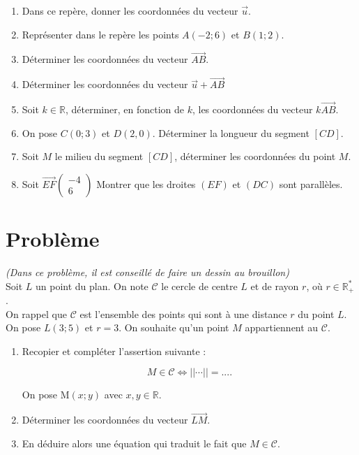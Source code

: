 \documentclass[french]{book}
\begin{document}
\begin{enumerate}

\item Dans ce repère, donner les coordonnées du vecteur $\overrightarrow{u}$.

\item Représenter dans le repère les points $A(-2 ;6)$ et $B(1;2)$.

\item Déterminer les coordonnées  du vecteur $\overrightarrow{AB}$.

\item Déterminer les coordonnées du vecteur $\overrightarrow{u} + \overrightarrow{AB} $

\item Soit $k \in \mathbb{R}$, déterminer, en fonction de $k$, les coordonnées du vecteur $k\overrightarrow{AB}$. 

\item On pose $C(0;3)$ et $D(2,0)$. Déterminer la longueur du segment $[CD]$.

\item Soit $M$ le milieu du segment $[CD]$, déterminer les coordonnées du point $M$.   

\item Soit $\overrightarrow{EF} \left( \begin{array}{c}
-4 \\
6 
\end{array} \right)$
 Montrer que les droites $(EF)$ et $(DC)$ sont parallèles.

\end{enumerate}

\section*{Problème}

\textit{(Dans ce problème, il est conseillé de faire un dessin au brouillon)}\\

Soit $L$ un point du plan. On note $\mathcal{C}$ le cercle de centre $L$ et de rayon $r$, où $r\in\mathbb{R}_+^*$.\\

On rappel que $\mathcal{C}$ est l’ensemble des points qui sont à une distance $r$ du point $L$. \\

On pose $L(3;5)$ et $r=3$. On souhaite qu’un point $M$ appartiennent au $\mathcal{C}$. 
\begin{enumerate}
\item Recopier et compléter l’assertion suivante :

$$ M \in \mathcal{C} \Longleftrightarrow \vert \vert  \cdots \vert \vert =  .... $$

On pose M$(x;y)$ avec $x,y \in \mathbb{R}$. 


\item Déterminer les coordonnées du vecteur $\overrightarrow{LM}$.
\item En déduire alors une équation qui traduit le fait que $M \in \mathcal{C}$.
\end{enumerate}
\end{document}
